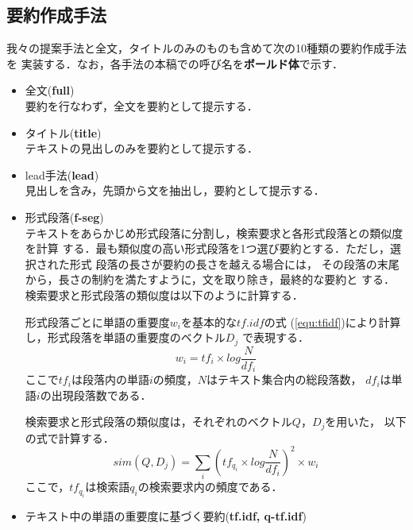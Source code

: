 \subsection{要約作成手法}
我々の提案手法と全文，タイトルのみのものも含めて次の10種類の要約作成手法を
実装する．なお，各手法の本稿での呼び名を{\bf ボールド体}で示す．
\begin{itemize}
\item 全文({\bf full})\\
	要約を行なわず，全文を要約として提示する．
\item タイトル({\bf title})\\
	テキストの見出しのみを要約として提示する．
\item lead手法({\bf lead})\\
	見出しを含み，先頭から文を抽出し，要約として提示する．
\item 形式段落({\bf f-seg})\\
テキストをあらかじめ形式段落に分割し，検索要求と各形式段落との類似度を計算
する．最も類似度の高い形式段落を1つ選び要約とする．ただし，選択された形式
段落の長さが要約の長さを越える場合には，
その段落の末尾から，長さの制約を満たすように，文を取り除き，最終的な要約と
する．
検索要求と形式段落の類似度は以下のように計算する．

形式段落ごとに単語の重要度$w_{i}$を基本的な$tf.idf$\cite{Salton:88b}の式
(\ref{equ:tfidf})により計算し，形式段落を単語の重要度のベクトル$D_{j}$
で表現する．
\begin{equation}\label{equ:tfidf}
\displaystyle{w_{i} = tf_{i}\times log\frac{N}{df_{i}}}
\end{equation}
ここで$tf_{i}$は段落内の単語$i$の頻度，$N$はテキスト集合内の総段落数，
$df_{i}$は単語$i$の出現段落数である．

検索要求と形式段落の類似度は，それぞれのベクトル$Q$，$D_{j}$を用いた，
以下の式で計算する．
\begin{equation}\label{equ:normsim}
sim(Q,D_{j}) = \sum_{i}(tf_{q_{i}}\times log\frac{N}{df_{i}})^2 \times w_{i}
\end{equation}
ここで，$tf_{q_{i}}$は検索語$q_{i}$の検索要求内の頻度である．
\item テキスト中の単語の重要度に基づく要約({\bf tf.idf, q-tf.idf})


\end{itemize}
